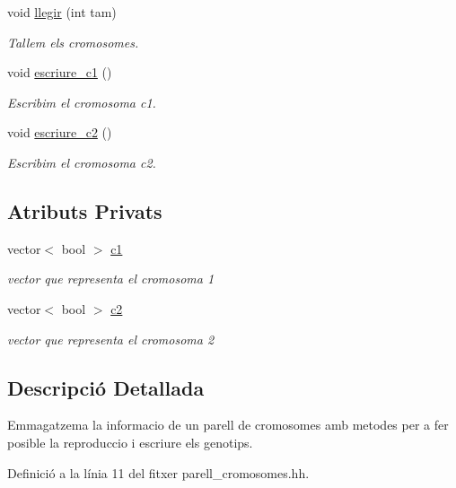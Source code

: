 \begin{DoxyCompactItemize}
void \hyperlink{classparell__cromosomes_a3217cc5eb83e77521b28f091c7cf5a5a}{llegir} (int tam)
\begin{DoxyCompactList}\small\item\em Tallem els cromosomes. \end{DoxyCompactList}\item 
void \hyperlink{classparell__cromosomes_a1bd9e226b1fe9d3e02302e9230c8b928}{escriure\+\_\+c1} ()
\begin{DoxyCompactList}\small\item\em Escribim el cromosoma c1. \end{DoxyCompactList}\item 
void \hyperlink{classparell__cromosomes_a109c96b0eb5e9c63ec97fa0b1e62c252}{escriure\+\_\+c2} ()
\begin{DoxyCompactList}\small\item\em Escribim el cromosoma c2. \end{DoxyCompactList}\end{DoxyCompactItemize}
\subsection*{Atributs Privats}
\begin{DoxyCompactItemize}
\item 
vector$<$ bool $>$ \hyperlink{classparell__cromosomes_ab4d7cfc40f53a1698b4ea3ef1f2cd199}{c1}
\begin{DoxyCompactList}\small\item\em vector que representa el cromosoma 1 \end{DoxyCompactList}\item 
vector$<$ bool $>$ \hyperlink{classparell__cromosomes_a888f09ecbc3329b0ee505fb0cb8bf98f}{c2}
\begin{DoxyCompactList}\small\item\em vector que representa el cromosoma 2 \end{DoxyCompactList}\end{DoxyCompactItemize}


\subsection{Descripció Detallada}
Emmagatzema la informacio de un parell de cromosomes amb metodes per a fer posible la reproduccio i escriure els genotips. 

Definició a la línia 11 del fitxer parell\+\_\+cromosomes.\+hh.



